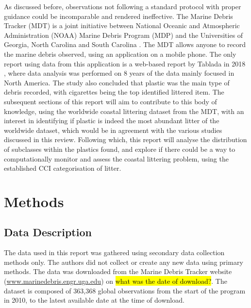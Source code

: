 \documentclass[10pt]{article}\usepackage[]{graphicx}\usepackage[]{color}
\begin{document}
As discussed before, observations not following a standard protocol with proper guidance could be incomparable and rendered ineffective. The Marine Debris Tracker (MDT) is a joint initiative between National Oceanic and Atmospheric Administration (NOAA) Marine Debris Program (MDP) and the Universities of Georgia, North Carolina and South Carolina \cite{JAMBECK2015B}. The MDT allows anyone to record the marine debris observed, using an application on a mobile phone. The only report using data from this application is a web-based report by Tablada in 2018 \cite{JAMBECK2015B}, where data analysis was performed on 8 years of the data mainly focused in North America. The study also concluded that plastic was the main type of debris recorded, with cigarettes being the top identified littered item. The subsequent sections of this report will aim to contribute to this body of knowledge, using the worldwide coastal littering dataset from the MDT, with an interest in identifying if plastic is indeed the most abundant litter of the worldwide dataset, which would be in agreement with the various studies discussed in this review. Following which, this report will analyse the distribution of subclasses within the plastics found, and explore if there could be a way to computationally monitor and assess the coastal littering problem, using the established CCI categorisation of litter. \\








\pagebreak
\section {Methods}\label{methods}

\subsection{Data Description}\label{dataset}

The data used in this report was gathered using secondary data collection methods only. The authors did not collect or create any new data using primary methods. The data was downloaded from the Marine Debris Tracker website (\url{www.marinedebris.engr.uga.edu}) on \hl{what was the date of download?}. The dataset is composed of 363,368 global observations from the start of the program in 2010, to the latest available date at the time of download. \\
\end{document}
